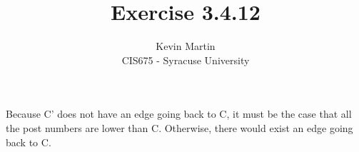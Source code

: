 \documentclass{article}
\author{Kevin Martin\\ CIS675 - Syracuse University}
\title{Exercise 3.4.12}
\begin{document}
\maketitle
Because C' does not have an edge going back to C, it must be the case that all the 
post numbers are lower than C. Otherwise, there would exist an edge going back to C.
\end{document}
